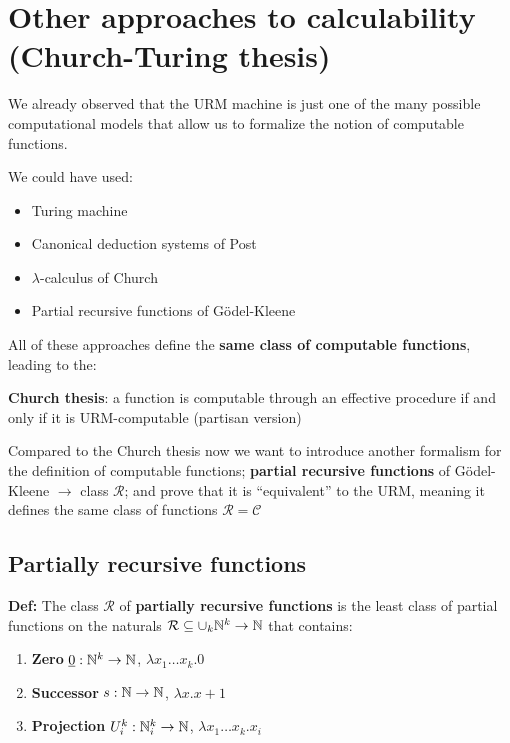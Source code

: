 \chapter{Other approaches to calculability (Church-Turing thesis)}
We already observed that the URM machine is just one of the many possible computational models that allow us to formalize the notion of computable functions.

We could have used:
\begin{itemize}
\item Turing machine
\item Canonical deduction systems of Post
\item $\lambda$-calculus of Church
\item Partial recursive functions of Gödel-Kleene
\end{itemize}

All of these approaches define the \textbf{same class of computable functions}, leading to the:

\textbf{Church thesis}: a function is computable through an effective procedure if and only if it is URM-computable (partisan version)

Compared to the Church thesis now we want to introduce another formalism for the definition of computable functions; \textbf{partial recursive functions} of Gödel-Kleene $\rightarrow$ class $\mathcal{R}$; and prove that it is ``equivalent'' to the URM, meaning it defines the same class of functions $\mathcal{R} = \mathcal{C}$

\section{Partially recursive functions}

\textbf{Def:} The class $ \mathcal{R} $ of \textbf{partially recursive functions} is the least class of partial functions on the naturals $\mathcal{R}\subseteq \cup_k \mathbb{N}^k\rightarrow\mathbb{N}$ that contains:

\begin{enumerate}[label=(\alph*)]
\item \textbf{Zero} $ \underline{0}: \mathbb{N}^k \rightarrow \mathbb{N} $, $\lambda x_1\dots x_k . 0$
\item \textbf{Successor} $ s: \mathbb{N} \rightarrow \mathbb{N} $, $\lambda x . x+1$
\item \textbf{Projection} $ U_i^k: \mathbb{N}_i^k \rightarrow \mathbb{N} $,  $\lambda x_1\dots x_k . x_i$
\end{enumerate}

